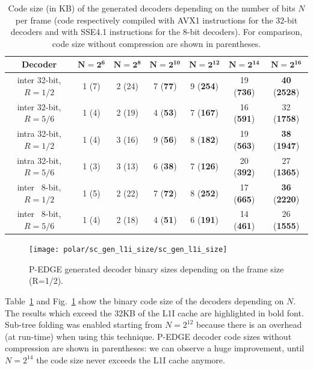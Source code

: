 \begin{table}
  \begin{center}
  \begin{tabular}{ c  c  c  c  c  c  c}
    \textbf{Decoder}         & $\bm{N = 2^6}$ & $\bm{N = 2^8}$ & $\bm{N = 2^{10}}$ & $\bm{N = 2^{12}}$ & $\bm{N = 2^{14}}$ & $\bm{N = 2^{16}}$           \\
    \hline
    \hline
    inter 32-bit, $R = 1/2$  & 1 (7)          & 2 (24)         & 7 (\textbf{77})   & 9 (\textbf{254})  & 19 (\textbf{736}) & \textbf{40} (\textbf{2528}) \\
    inter 32-bit, $R = 5/6$  & 1 (4)          & 2 (19)         & 4 (\textbf{53})   & 7 (\textbf{167})  & 16 (\textbf{591}) & 32          (\textbf{1758}) \\
    intra 32-bit, $R = 1/2$  & 1 (4)          & 3 (16)         & 9 (\textbf{56})   & 8 (\textbf{182})  & 19 (\textbf{563}) & \textbf{38} (\textbf{1947}) \\
    intra 32-bit, $R = 5/6$  & 1 (3)          & 3 (13)         & 6 (\textbf{38})   & 7 (\textbf{126})  & 20 (\textbf{392}) & 27          (\textbf{1365}) \\
    inter ~8-bit, $R = 1/2$  & 1 (5)          & 2 (22)         & 7 (\textbf{72})   & 8 (\textbf{252})  & 17 (\textbf{665}) & \textbf{36} (\textbf{2220}) \\
    inter ~8-bit, $R = 5/6$  & 1 (4)          & 2 (18)         & 4 (\textbf{51})   & 6 (\textbf{191})  & 14 (\textbf{461}) & 26          (\textbf{1555}) \\
  \end{tabular}
  \end{center}
  \caption{Code size (in KB) of the generated decoders depending on the number
    of bits $N$ per frame (code respectively compiled with AVX1 instructions for
    the 32-bit decoders and with SSE4.1 instructions for the 8-bit decoders).
    For comparison, code size without compression are shown in parentheses.}
  \label{tab:polar_sc_gen_l1i_size}
\end{table}

\begin{figure}
  \texttt{[image: polar/sc\_gen\_l1i\_size/sc\_gen\_l1i\_size]}
  \caption{P-EDGE generated decoder binary sizes depending on the frame size
    (R=1/2).}
  \label{plot:polar_sc_gen_l1i_size}
\end{figure}

Table~\ref{tab:polar_sc_gen_l1i_size} and Fig.~\ref{plot:polar_sc_gen_l1i_size}
show the binary code size of the decoders depending on $N$. The results which
exceed the 32KB of the L1I cache are highlighted in bold font. Sub-tree folding
was enabled starting from $N=2^{12}$ because there is an overhead (at run-time)
when using this technique. P-EDGE decoder code sizes without compression are
shown in parentheses: we can observe a huge improvement, until $N=2^{14}$ the
code size never exceeds the L1I cache anymore.


